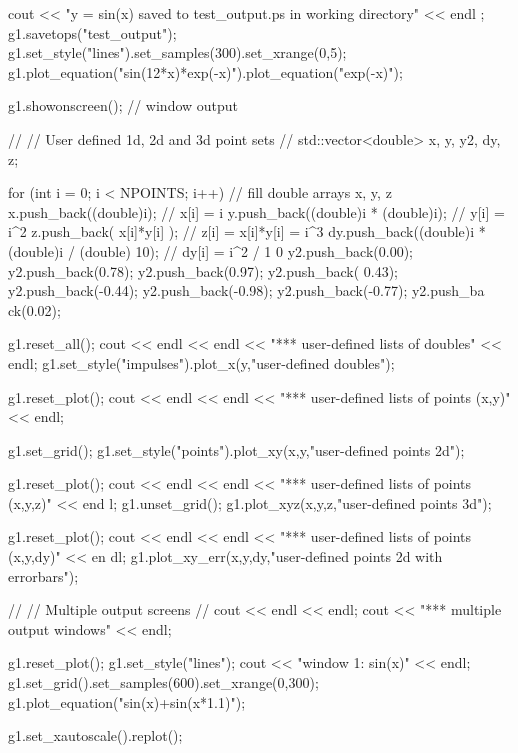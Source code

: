 \begin{DoxyCode}
{{        cout << "y = sin(x) saved to test_output.ps in working directory" << endl
      ;
        g1.savetops("test_output");
        g1.set_style("lines").set_samples(300).set_xrange(0,5);
        g1.plot_equation("sin(12*x)*exp(-x)").plot_equation("exp(-x)");

        g1.showonscreen(); // window output


        //
        // User defined 1d, 2d and 3d point sets
        //
        std::vector<double> x, y, y2, dy, z;

        for (int i = 0; i < NPOINTS; i++)  // fill double arrays x, y, z
        {
            x.push_back((double)i);             // x[i] = i
            y.push_back((double)i * (double)i); // y[i] = i^2
            z.push_back( x[i]*y[i] );           // z[i] = x[i]*y[i] = i^3
            dy.push_back((double)i * (double)i / (double) 10); // dy[i] = i^2 / 1
      0
        }
        y2.push_back(0.00); y2.push_back(0.78); y2.push_back(0.97); y2.push_back(
      0.43);
        y2.push_back(-0.44); y2.push_back(-0.98); y2.push_back(-0.77); y2.push_ba
      ck(0.02);


        g1.reset_all();
        cout << endl << endl << "*** user-defined lists of doubles" << endl;
        g1.set_style("impulses").plot_x(y,"user-defined doubles");

        g1.reset_plot();
        cout << endl << endl << "*** user-defined lists of points (x,y)" << endl;
      
        g1.set_grid();
        g1.set_style("points").plot_xy(x,y,"user-defined points 2d");

        g1.reset_plot();
        cout << endl << endl << "*** user-defined lists of points (x,y,z)" << end
      l;
        g1.unset_grid();
        g1.plot_xyz(x,y,z,"user-defined points 3d");

        g1.reset_plot();
        cout << endl << endl << "*** user-defined lists of points (x,y,dy)" << en
      dl;
        g1.plot_xy_err(x,y,dy,"user-defined points 2d with errorbars");


        //
        // Multiple output screens
        //
        cout << endl << endl;
        cout << "*** multiple output windows" << endl;

        g1.reset_plot();
        g1.set_style("lines");
        cout << "window 1: sin(x)" << endl;
        g1.set_grid().set_samples(600).set_xrange(0,300);
        g1.plot_equation("sin(x)+sin(x*1.1)");

        g1.set_xautoscale().replot();

}}
\end{DoxyCode}
